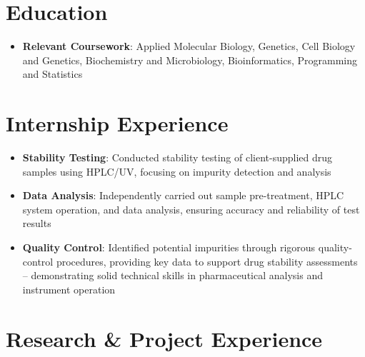 \documentclass{my-resume}
\begin{document}


\section{Education}
\begin{itemize}[parsep=0.2ex]
  \item \textbf{Relevant Coursework}: Applied Molecular Biology, Genetics, Cell Biology and Genetics, Biochemistry and Microbiology, Bioinformatics, Programming and Statistics
\end{itemize}

\section{Internship Experience}
\begin{itemize}[parsep=0.2ex]
  \item \textbf{Stability Testing}: Conducted stability testing of client-supplied drug samples using HPLC/UV, focusing on impurity detection and analysis
  \item \textbf{Data Analysis}: Independently carried out sample pre-treatment, HPLC system operation, and data analysis, ensuring accuracy and reliability of test results
  \item \textbf{Quality Control}: Identified potential impurities through rigorous quality-control procedures, providing key data to support drug stability assessments -- demonstrating solid technical skills in pharmaceutical analysis and instrument operation
\end{itemize}

\section{Research \& Project Experience}
\end{document}
